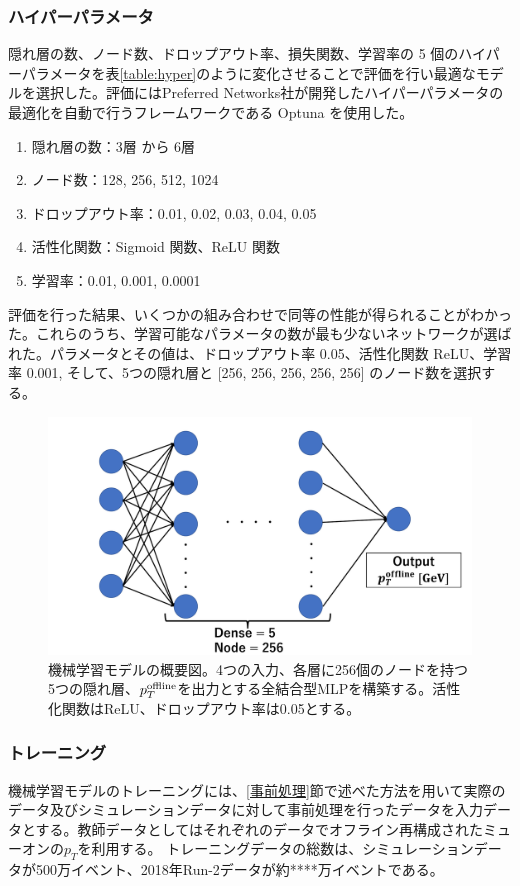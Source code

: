 \subsubsection{ハイパーパラメータ}
隠れ層の数、ノード数、ドロップアウト率、損失関数、学習率の 5 個のハイパーパラメータを表\ref{table:hyper}のように変化させることで評価を行い最適なモデルを選択した。評価にはPreferred Networks社が開発したハイパーパラメータの最適化を自動で行うフレームワークである Optuna \cite{article:optuna}を使用した。
\begin{enumerate}\label{table:hyper}
   \item 隠れ層の数：3層 から 6層
   \item ノード数：128, 256, 512, 1024
   \item ドロップアウト率：0.01, 0.02, 0.03, 0.04, 0.05
   \item 活性化関数：Sigmoid 関数、ReLU 関数
   \item 学習率：0.01, 0.001, 0.0001
\end{enumerate}
評価を行った結果、いくつかの組み合わせで同等の性能が得られることがわかった。これらのうち、学習可能なパラメータの数が最も少ないネットワークが選ばれた。パラメータとその値は、ドロップアウト率 0.05、活性化関数 ReLU、学習率 0.001, そして、5つの隠れ層と [256, 256, 256, 256, 256] のノード数を選択する。

\begin{figure}[tb]
  \centering
  \includegraphics[clip, width=12cm]{fig/4/MLP_2.pdf}
  \caption{機械学習モデルの概要図。4つの入力、各層に256個のノードを持つ5つの隠れ層、$p_{T}^{\rm{offline}}$を出力とする全結合型MLPを構築する。活性化関数はReLU、ドロップアウト率は0.05とする。}
  \label{fig:MLP_overview}
\end{figure}


\subsubsection{トレーニング}
機械学習モデルのトレーニングには、\ref{事前処理}節で述べた方法を用いて実際のデータ及びシミュレーションデータに対して事前処理を行ったデータを入力データとする。教師データとしてはそれぞれのデータでオフライン再構成されたミューオンの$p_T$を利用する。
トレーニングデータの総数は、シミュレーションデータが500万イベント、2018年Run-2データが約****万イベントである。


